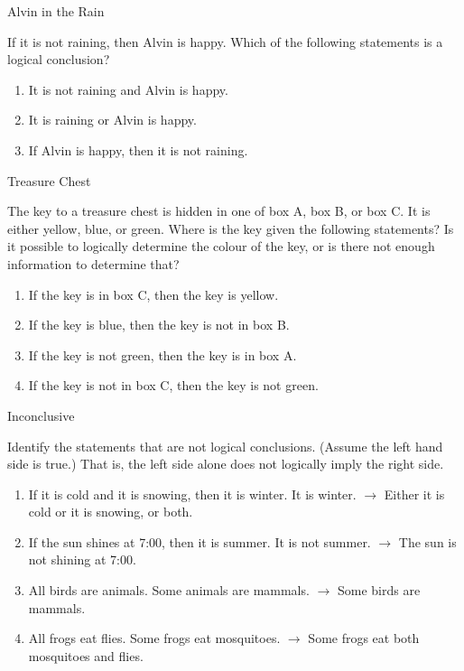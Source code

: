 \documentclass[a4paper,10pt]{report}
\begin{document}
\begin{problem}{Alvin in the Rain}

 If it is not raining, then Alvin is happy. Which of the following statements is
 a logical conclusion?

 \begin{enumerate}[\hspace{.5cm}a.]
  \item It is not raining and Alvin is happy.
  \item It is raining or Alvin is happy.
  \item If Alvin is happy, then it is not raining.
 \end{enumerate}
\end{problem}

\begin{problem}{Treasure Chest}

The key to a treasure chest is hidden in one of box A, box B, or box C. It is
either yellow, blue, or green. Where is the key given the following statements?
Is it possible to logically determine the colour of the key, or is there not
enough information to determine that?

 \begin{enumerate}
  \item If the key is in box C, then the key is yellow.
  \item If the key is blue, then the key is not in box B.
  \item If the key is not green, then the key is in box A.
  \item If the key is not in box C, then the key is not green.
 \end{enumerate}
\end{problem}

\begin{problem}{Inconclusive}

 Identify the statements that are not logical conclusions. (Assume the left hand
 side is true.) That is, the left side alone does not logically imply the right
 side.

 \begin{enumerate}[\hspace{.5cm}a.]
  \item If it is cold and it is snowing, then it is winter. It is winter. $\to$
  Either it is cold or it is snowing, or both.
  \item If the sun shines at 7:00, then it is summer. It is not summer. $\to$
  The sun is not shining at 7:00.
  \item All birds are animals. Some animals are mammals. $\to$ Some birds are
  mammals.
  \item All frogs eat flies. Some frogs eat mosquitoes. $\to$ Some frogs eat
  both mosquitoes and flies.
 \end{enumerate}

\end{problem}
\end{document}
